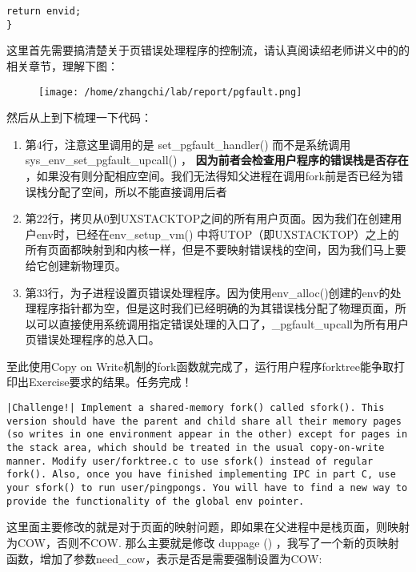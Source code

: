 \documentclass{article}
\newcommand{\highlight}[1]{{\bfseries \color{red}  #1}}
\newcommand{\funcname}[1]{{\ttfamily \small #1}}
\begin{document}
\begin{CJK*}{UTF8}{gkai}
\begin{lstlisting}[style=ccode, title={\scriptsize \ttfamily \bfseries lib/fork.c: fork()}]
    return envid;
}
\end{lstlisting}

这里首先需要搞清楚关于页错误处理程序的控制流，请认真阅读绍老师讲义中的的相关章节，理解下图：

\begin{figure}[htp]
\centering
\texttt{[image: /home/zhangchi/lab/report/pgfault.png]}
\end{figure}


然后从上到下梳理一下代码：

\begin{enumerate}
\item{第4行，注意这里调用的是 \funcname{ set\_pgfault\_handler() } 而不是系统调用 \funcname{ sys\_env\_set\_pgfault\_upcall() }，\highlight{ 因为前者会检查用户程序的错误栈是否存在 }，如果没有则分配相应空间。我们无法得知父进程在调用fork前是否已经为错误栈分配了空间，所以不能直接调用后者}
\item{第22行，拷贝从0到UXSTACKTOP之间的所有用户页面。因为我们在创建用户env时，已经在\funcname{env\_setup\_vm()} 中将UTOP（即UXSTACKTOP）之上的所有页面都映射到和内核一样，但是不要映射错误栈的空间，因为我们马上要给它创建新物理页。}
\item{第33行，为子进程设置页错误处理程序。因为使用\funcname{env\_alloc()}创建的env的处理程序指针都为空，但是这时我们已经明确的为其错误栈分配了物理页面，所以可以直接使用系统调用指定错误处理的入口了，\_pgfault\_upcall为所有用户页错误处理程序的总入口。}

\end{enumerate}

至此使用Copy on Write机制的fork函数就完成了，运行用户程序forktree能争取打印出Exercise要求的结果。任务完成！

\begin{lstlisting}[style=challenge]
|Challenge!| Implement a shared-memory fork() called sfork(). This version should have the parent and child share all their memory pages (so writes in one environment appear in the other) except for pages in the stack area, which should be treated in the usual copy-on-write manner. Modify user/forktree.c to use sfork() instead of regular fork(). Also, once you have finished implementing IPC in part C, use your sfork() to run user/pingpongs. You will have to find a new way to provide the functionality of the global env pointer.
\end{lstlisting}

这里面主要修改的就是对于页面的映射问题，即如果在父进程中是栈页面，则映射为COW，否则不COW. 那么主要就是修改 \funcname{duppage ()} ，我写了一个新的页映射函数，增加了参数need\_cow，表示是否是需要强制设置为COW:


\end{CJK*}
\end{document}
